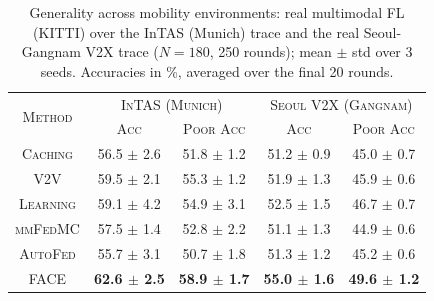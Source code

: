 \begin{table}[t]
    \centering
    \caption{Generality across mobility environments: real multimodal FL (KITTI) over the InTAS (Munich) trace and the real Seoul-Gangnam V2X trace ($N{=}180$, 250 rounds); mean $\pm$ std over 3 seeds. Accuracies in \%, averaged over the final 20 rounds.}
    \label{tab:mobility}
    \renewcommand{\arraystretch}{1.15}
    \setlength{\tabcolsep}{4.5pt}
    \begin{tabular}{c|c|c|c|c}
        \hline
        \multirow{2}{*}{\textsc{Method}} & \multicolumn{2}{c|}{\textsc{InTAS (Munich)}} & \multicolumn{2}{c}{\textsc{Seoul V2X (Gangnam)}} \\
        & \textsc{Acc} & \textsc{Poor Acc} & \textsc{Acc} & \textsc{Poor Acc} \\
        \hline
        \textsc{Caching} & 56.5 $\pm$ 2.6 & 51.8 $\pm$ 1.2 & 51.2 $\pm$ 0.9 & 45.0 $\pm$ 0.7 \\
        \textsc{V2V} & 59.5 $\pm$ 2.1 & 55.3 $\pm$ 1.2 & 51.9 $\pm$ 1.3 & 45.9 $\pm$ 0.6 \\
        \textsc{Learning} & 59.1 $\pm$ 4.2 & 54.9 $\pm$ 3.1 & 52.5 $\pm$ 1.5 & 46.7 $\pm$ 0.7 \\
        \hline
        \textsc{mmFedMC} & 57.5 $\pm$ 1.4 & 52.8 $\pm$ 2.2 & 51.1 $\pm$ 1.3 & 44.9 $\pm$ 0.6 \\
        \textsc{AutoFed} & 55.7 $\pm$ 3.1 & 50.7 $\pm$ 1.8 & 51.3 $\pm$ 1.2 & 45.2 $\pm$ 0.6 \\
        \hline
        \textsc{FACE} & \textbf{62.6 $\pm$ 2.5} & \textbf{58.9 $\pm$ 1.7} & \textbf{55.0 $\pm$ 1.6} & \textbf{49.6 $\pm$ 1.2} \\
        \hline
    \end{tabular}
\end{table}
